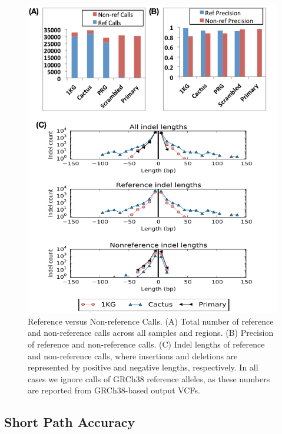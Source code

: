 \begin{figure}[htbp]
\centering
\includegraphics[width=\textwidth]{figures/04_bakeoff/figure05.png}
\caption[Reference versus non-reference calls]{Reference versus Non-reference Calls. (A) Total number of
reference and non-reference calls across all samples and regions. (B)
Precision of reference and non-reference calls. (C) Indel lengths of
reference and non-reference calls, where insertions and deletions are
represented by positive and negative lengths, respectively. In all cases
we ignore calls of GRCh38 reference alleles, as these numbers are
reported from GRCh38-based output VCFs.}
\label{fig:bakeoff:refnonref}
\end{figure}

\subsection{Short Path Accuracy}

